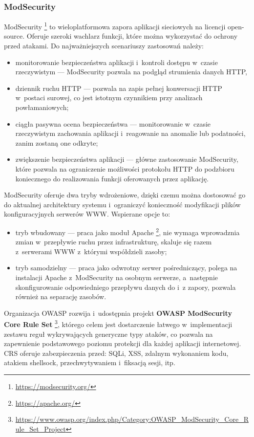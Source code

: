 \documentclass[12pt,a4paper,polish,thesis]{dcsbook}
\begin{document}
\subsubsection{ModSecurity}
ModSecurity \footnote{\url{https://modsecurity.org/}} to wieloplatformowa zapora aplikacji sieciowych na licencji open-source. Oferuje szeroki wachlarz funkcji, które można wykorzystać do ochrony przed atakami. Do najważniejszych scenariuszy zastosowań należy:
\begin{itemize} 
\item monitorowanie bezpieczeństwa aplikacji i~kontroli dostępu w~czasie rzeczywistym --- ModSecurity pozwala na podgląd strumienia danych HTTP,
\item dziennik ruchu HTTP --- pozwala na zapis pełnej konwersacji HTTP w~postaci surowej, co jest istotnym czynnikiem przy analizach powłamaniowych;
\item ciągła pasywna ocena bezpieczeństwa --- monitorowanie w~czasie rzeczywistym zachowania aplikacji i~reagowanie na anomalie lub podatności, zanim zostaną one odkryte;
\item zwiększenie bezpieczeństwa aplikacji --- główne zastosowanie ModSecurity, które pozwala na ograniczenie możliwości protokołu HTTP do podzbioru koniecznego do realizowania funkcji oferowanych przez aplikację.
\end{itemize}

ModSecurity oferuje dwa tryby wdrożeniowe, dzięki czemu można dostosować go do aktualnej architektury systemu i~ograniczyć konieczność modyfikacji plików konfiguracyjnych serwerów WWW. Wspierane opcje to:
\begin{itemize}
\item tryb wbudowany --- praca jako moduł Apache \footnote{\url{https://apache.org/}}, nie wymaga wprowadznia zmian w~przepływie ruchu przez infrastrukturę, skaluje się razem z~serwerami WWW z~którymi współdzieli zasoby;
\item tryb samodzielny --- praca jako odwrotny serwer pośredniczący, polega na instalacji Apache z~ModSecurity na osobnym serwerze, a~następnie skonfigurowanie odpowiedniego przepływu danych do i~z zapory, pozwala również na separację zasobów.
\end{itemize}

Organizacja OWASP rozwija i~udostępnia projekt \textbf{OWASP ModSecurity Core Rule Set} \footnote{\url{https://www.owasp.org/index.php/Category:OWASP_ModSecurity_Core_Rule_Set_Project}}, którego celem jest dostarczenie łatwego w~implementacji zestawu reguł wykrywających generyczne typy ataków, co pozwala na zapewnienie podstawowego poziomu protekcji dla każdej aplikacji internetowej. CRS oferuje zabezpieczenia przed: SQLi, XSS, zdalnym wykonaniem kodu, atakiem shellsock, przechwytywaniem i~fiksacją sesji, itp.
\end{document}
